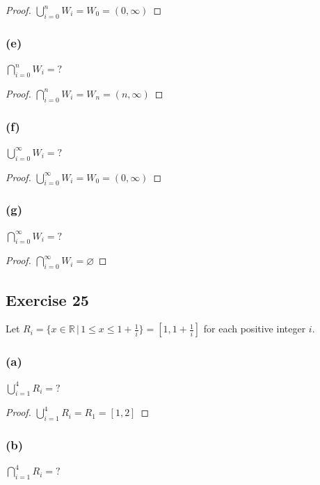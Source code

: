 \documentclass[14pt]{extarticle}
\newcommand{\es}{\varnothing}
\newcommand{\dps}{\displaystyle}
\newcommand{\R}{\mathbb{R}}
\begin{document}
\begin{proof}
\(\dps \bigcup_{i=0}^{n}W_i = W_0 = (0, \infty)\)
\end{proof}

\subsubsection{(e)}
\(\dps \bigcap_{i=0}^{n}W_i = ?\)

\begin{proof}
\(\dps \bigcap_{i=0}^{n}W_i = W_n = (n, \infty)\)
\end{proof}

\subsubsection{(f)}
\(\dps \bigcup_{i=0}^{\infty}W_i = ?\)

\begin{proof}
\(\dps \bigcup_{i=0}^{\infty}W_i = W_0 = (0, \infty)\)
\end{proof}

\subsubsection{(g)}
\(\dps \bigcap_{i=0}^{\infty}W_i = ?\)

\begin{proof}
\(\dps \bigcap_{i=0}^{\infty}W_i = \es\)
\end{proof}

\subsection{Exercise 25}
Let \(R_i = \{x \in \R \,|\, 1 \leq x \leq 1 + \frac{1}{i}\} = \left[1, 1 + \frac{1}{i}\right]\) 
for each positive integer $i$.

\subsubsection{(a)}
\(\dps \bigcup_{i=1}^{4}R_i = ?\)

\begin{proof}
\(\dps \bigcup_{i=1}^{4}R_i = R_1 = [1, 2]\)
\end{proof}

\subsubsection{(b)}
\(\dps \bigcap_{i=1}^{4}R_i = ?\)
\end{document}
